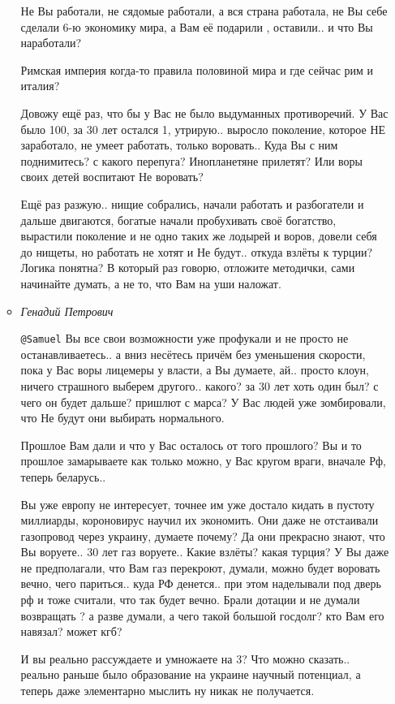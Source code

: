 \begin{itemize}
\begin{itemize}
Не Вы работали, не сядомые работали, а вся страна работала, не Вы себе сделали
6-ю экономику мира, а Вам её подарили , оставили.. и что Вы наработали? 

Римская империя когда-то правила половиной мира и где сейчас рим и италия?

Довожу ещё раз, что бы у Вас не было выдуманных противоречий. У Вас было 100,
за 30 лет остался 1, утрирую.. выросло поколение, которое НЕ заработало, не
умеет работать, только воровать.. Куда Вы с ним поднимитесь? с какого
перепуга? Инопланетяне прилетят? Или воры своих детей воспитают Не воровать?

Ещё раз разжую.. нищие собрались, начали работать и разбогатели и дальше
двигаются, богатые начали пробухивать своё богатство, вырастили поколение и не
одно таких же лодырей и воров, довели себя до нищеты, но работать не хотят и
Не будут.. откуда взлёты к турции? Логика понятна? В который раз говорю,
отложите методички, сами начинайте думать, а не то, что Вам на уши наложат.

 
\item \emph{Генадий Петрович}

\verb|@Samuel|  Вы все свои возможности уже профукали и не просто не
останавливаетесь.. а вниз несётесь причём без уменьшения скорости, пока у Вас
воры лицемеры у власти, а Вы думаете, ай.. просто клоун, ничего страшного
выберем другого.. какого? за 30 лет хоть один был? с чего он будет дальше?
пришлют с марса? У Вас людей уже зомбировали, что Не будут они выбирать
нормального.

Прошлое Вам дали и что у Вас осталось от того прошлого? Вы и то прошлое
замарываете как только можно, у Вас кругом враги, вначале Рф, теперь
беларусь..

Вы уже европу не интересует, точнее им уже достало кидать в пустоту миллиарды,
короновирус научил их экономить. Они даже не отстаивали газопровод через
украину, думаете почему? Да они прекрасно знают, что Вы воруете.. 30 лет газ
воруете.. Какие взлёты? какая турция? У Вы даже не предполагали, что Вам газ
перекроют, думали, можно будет воровать вечно, чего париться.. куда РФ
денется.. при этом наделывали под дверь рф и тоже считали, что так будет
вечно. Брали дотации и не думали возвращать ? а разве думали, а чего такой
большой госдолг? кто Вам его навязал? может кгб? 

И вы реально рассуждаете и умножаете на 3? Что можно сказать.. реально раньше
было образование на украине научный потенциал, а теперь даже элементарно
мыслить ну никак не получается.


\end{itemize}
\end{itemize}
